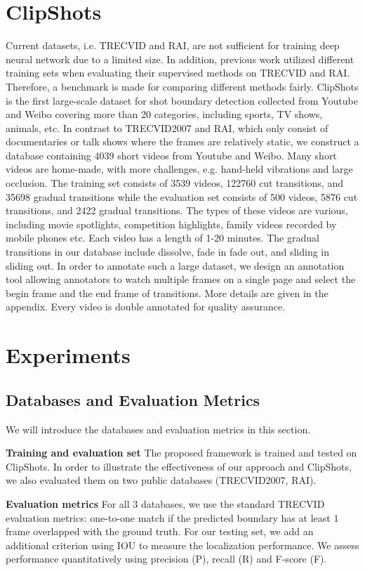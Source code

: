 \documentclass[runningheads]{llncs}
\begin{document}
\section{ClipShots}
Current datasets, i.e. TRECVID and RAI, are not sufficient for training deep neural network due to a limited size. In addition, previous work utilized different training sets when evaluating their supervised methods on TRECVID and RAI. Therefore, a benchmark is made for comparing different methods fairly. ClipShots is the first large-scale dataset for shot boundary detection collected from Youtube and Weibo covering more than 20 categories, including sports, TV shows, animals, etc. In contrast to TRECVID2007 and RAI, which only consist of documentaries or talk shows where the frames are relatively static, we construct a database containing 4039 short videos from Youtube and Weibo. Many short videos are home-made, with more challenges, e.g. hand-held vibrations and large occlusion. The training set consists of 3539 videos, 122760 cut transitions, and 35698 gradual transitions while the evaluation set consists of 500 videos, 5876 cut transitions, and 2422 gradual transitions. The types of these videos are various, including movie spotlights, competition highlights, family videos recorded by mobile phones etc. Each video has a length of 1-20 minutes. The gradual transitions in our database include dissolve, fade in fade out, and sliding in sliding out. In order to annotate such a large dataset, we design an annotation tool allowing annotators to watch multiple frames on a single page and select the begin frame and the end frame of transitions. More details are given in the appendix. Every video is double annotated for quality assurance.

\section{Experiments}
\subsection{Databases and Evaluation Metrics}
We will introduce the databases and evaluation metrics in this section.

\textbf{Training and evaluation set} The proposed framework is trained and tested on ClipShots. 
In order to illustrate the effectiveness of our approach and ClipShots, we also evaluated them on two public databases (TRECVID2007, RAI).

\textbf{Evaluation metrics} For all 3 databases, we use the standard TRECVID evaluation metrics: one-to-one match if the predicted boundary has at least 1 frame overlapped with the ground truth. For our testing set, we add an additional criterion using IOU to measure the localization performance. We assess performance quantitatively using precision (P), recall (R) and F-score (F). 
\end{document}
